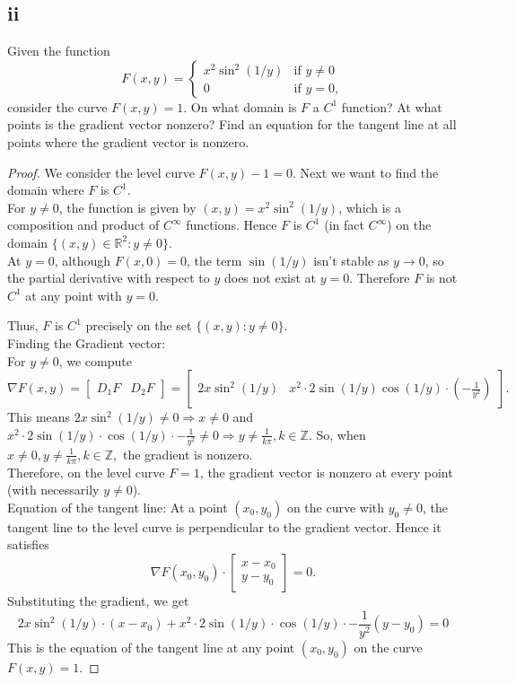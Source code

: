 \documentclass{article}
\begin{document}
\subsection*{ii}
Given the function
$$F (x, y) =
\begin{cases}
    x^2 \sin^2(1/y) & \text{if } y \neq 0 \\
    0  & \text{if } y = 0,
\end{cases}
$$
consider the curve $F (x, y) = 1$. On what domain is $F$ a $C^1$ function? At what points is the gradient vector nonzero? Find an equation for the tangent line at all points where the gradient vector is nonzero.
\begin{proof}
    We consider the level curve $F(x,y)-1=0.$ Next we want to find the domain where $F$ is $C^1$.\\
    For $y \neq 0$, the function is given by $(x,y)=x^2\sin^2(1/y)$, which is a composition and product of $C^\infty$ functions. Hence $F$ is $C^1$ (in fact $C^\infty$) on the domain $\{(x,y)\in\mathbb{R}^2 : y\neq 0\}.$\\
    At $y=0$, although $F(x,0)=0$, the term $\sin(1/y)$ isn't stable as $y\to 0$, so the partial derivative with respect to $y$ does not exist at $y=0$. Therefore $F$ is not $C^1$ at any point with $y=0$.

    Thus, $F$ is $C^1$ precisely on the set $\{(x,y): y\neq 0\}$. \\
    Finding the Gradient vector:\\
    For $y\neq 0$, we compute
    $$\nabla F(x,y)
    =
    \begin{bmatrix}
    D_1F & D_2F
    \end{bmatrix}
    =
    \begin{bmatrix}
    2x\sin^2(1/y) &
    x^2 \cdot 2\sin(1/y)\cos(1/y)\cdot \left(-\frac{1}{y^2}\right)
    \end{bmatrix}.
    $$
    This means $2x\sin^2(1/y) \neq 0 \Rightarrow x\neq 0$ and $x^2\cdot  2\sin(1/y)\cdot \cos(1/y)\cdot -\frac{1}{y^2}\neq0 \Rightarrow y\neq \frac{1}{k\pi}, k\in 
    \mathbb{Z}.$ So, when $x \neq 0, y \neq \frac{1}{k\pi}, k\in \mathbb{Z},$ the gradient is nonzero. \\
    Therefore, on the level curve $F=1$, the gradient vector is nonzero at every point (with necessarily $y\neq 0$).  \\
    Equation of the tangent line:
    At a point $(x_0,y_0)$ on the curve with $y_0\neq 0$, the tangent line to the level curve is perpendicular to the gradient vector. Hence it satisfies
    \[
    \nabla F(x_0,y_0)\cdot 
    \begin{bmatrix}
        x-x_0 \\ 
        y-y_0
    \end{bmatrix}
    =0.
    \]
    Substituting the gradient, we get $$2x\sin^2(1/y)\cdot (x-x_0)+ x^2\cdot  2\sin(1/y)\cdot \cos(1/y)\cdot -\frac{1}{y^2}(y-y_0)=0$$
    This is the equation of the tangent line at any point $(x_0,y_0)$ on the curve $F(x,y)=1$.
\end{proof}
\end{document}
